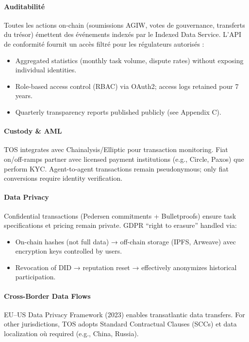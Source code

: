 \documentclass[11pt]{article}
\begin{document}
\paragraph{Auditabilité}
Toutes les actions on-chain (soumissions AGIW, votes de gouvernance, transferts du trésor) émettent des événements indexés par le Indexed Data Service. L'API de conformité fournit un accès filtré pour les régulateurs autorisés :
\begin{itemize}[noitemsep]
  \item Aggregated statistics (monthly task volume, dispute rates) without exposing individual identities.
  \item Role-based access control (RBAC) via OAuth2; access logs retained pour 7 years.
  \item Quarterly transparency reports published publicly (see Appendix C).
\end{itemize}

\paragraph{Custody \& AML}
TOS integrates avec Chainalysis/Elliptic pour transaction monitoring. Fiat on/off-ramps partner avec licensed payment institutions (e.g., Circle, Paxos) que perform KYC. Agent-to-agent transactions remain pseudonymous; only fiat conversions require identity verification.

\paragraph{Data Privacy}
Confidential transactions (Pedersen commitments + Bulletproofs) ensure task specifications et pricing remain private. GDPR ``right to erasure'' handled via:
\begin{itemize}[noitemsep]
  \item On-chain hashes (not full data) → off-chain storage (IPFS, Arweave) avec encryption keys controlled by users.
  \item Revocation of DID → reputation reset → effectively anonymizes historical participation.
\end{itemize}

\paragraph{Cross-Border Data Flows}
EU--US Data Privacy Framework (2023) enables transatlantic data transfers. For other jurisdictions, TOS adopts Standard Contractual Clauses (SCCs) et data localization où required (e.g., China, Russia).
\end{document}
